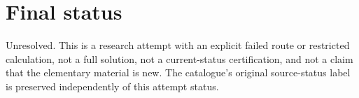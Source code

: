 \documentclass[11pt]{article}
\begin{document}
\section{Final status}
Unresolved. This is a research attempt with an explicit failed route or restricted
calculation, not a full solution, not a current-status certification, and not a claim
that the elementary material is new. The catalogue's original source-status label
is preserved independently of this attempt status.
\end{document}
